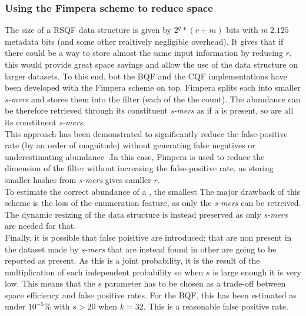 \subsubsection{Using the Fimpera scheme to reduce space}
The size of a RSQF data structure is given by $2^q * (r + m )$ bits with $m~ 2.125$ metadata bits (and some other realtively negligible overhead). It gives that if there could be a way to store almost the same input information by reducing $r$, this would provide great space savings and allow the use of the data structure on larger datasets. To this end, bot the BQF and the CQF implementations have been developed with the Fimpera scheme on top.
Fimpera splits each \kmer into smaller \emph{s-mers} and stores them into the filter (each of the the \kmer count). The \kmer abundance can be therefore retrieved through its constituent \emph{s-mers} as if a \kmer is present, so are all its constituent \emph{s-mers}.\\
This approach has been demonstrated to significantly reduce the false-positive rate (by an order of magnitude) without generating false negatives or underestimating \kmer abundance~\cite{fimpera}.In this case, Fimpera is used to reduce the dimension of the filter without increasing the false-positive rate, as storing smaller hashes from \emph{s-mers} gives samller $r$.\\
To estimate the correct abundance of a \kmer, the smallest 
The major drawback of this scheme is the loss of the \kmer enumeration feature, as only the \emph{s-mers} can be retreived. The dynamic resizing of the data structure is instead preserved as only \emph{s-mers} are needed for that.\\
Finally, it is possible that false poisitive \kmers are introduced: \kmers that are non present in the dataset made by \emph{s-mers} that are instead found in other \kmers are going to be reported as present. As this is a joint probability, it is the result of the multiplication of each independent probability so when $s$ is large enough it is very low. This means that the $s$ parameter has to be chosen as a trade-off between space efficiency and false positive rates. For the BQF, this has been estimated as under $10^{-5}\%$ with $s > 20$ when $k = 32$. This is a reasonable false positive rate.
